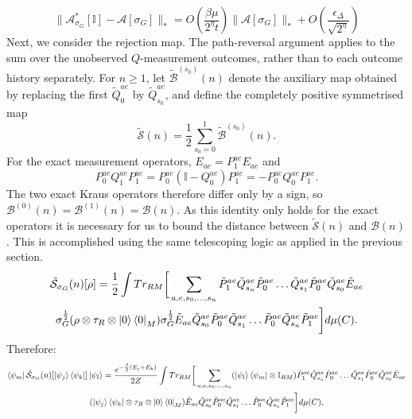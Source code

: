 \documentclass[aps,floatfix,10pt,amssymb,amsfont,amsmath,superscriptaddress,float,nofootinbib,longbibliography,nobalancelastpage,twocolumn]{revtex4-2}
\begin{document}
\begin{widetext}
\begin{equation}
    \|\mathcal{A}^*_{\sigma_G}[\mathbb{I}] - \mathcal{A}[\sigma_G]\|_* = O\!\left(\frac{\beta\mu}{2^{\eta}t}\right)\|\mathcal{A}[\sigma_G]\|_* + O\!\left(\frac{\epsilon_{\Delta}}{\sqrt{2^{\eta}}}\right)
\end{equation}
Next, we consider the rejection map.  The path-reversal argument applies to the
sum over the unobserved $Q$-measurement outcomes, rather than to each outcome
history separately.  For $n\geq 1$, let $\tilde{\mathcal{B}}^{(s_0)}(n)$ denote
the auxiliary map obtained by replacing the first $\tilde Q^{ae}_0$ by
$\tilde Q^{ae}_{s_0}$, and define the completely positive symmetrised map
\begin{equation*}
    \tilde{\mathcal{S}}(n)=\frac{1}{2}\sum_{s_0=0}^1
    \tilde{\mathcal{B}}^{(s_0)}(n).
\end{equation*}
For the exact measurement operators, $E_{ae}=P^{ae}_1E_{ae}$ and
\begin{equation*}
    P^{ae}_0Q^{ae}_1P^{ae}_1
    =P^{ae}_0(\mathbb I-Q^{ae}_0)P^{ae}_1
    =-P^{ae}_0Q^{ae}_0P^{ae}_1.
\end{equation*}
The two exact Kraus operators therefore differ only by a sign, so
$\mathcal{B}^{(0)}(n)=\mathcal{B}^{(1)}(n)=\mathcal{B}(n)$.  As this identity only holds for the exact operators it is necessary for us to bound the distance between $\tilde{\mathcal S}(n)$ and $\mathcal B(n)$. This is accomplished using the same telescoping logic as applied in the previous section.
\begin{multline}
    \tilde{\mathcal{S}}_{\sigma_G}(n)[\rho] = \frac12\int Tr_{RM}\bigg[ \sum_{a,e,s_0,\ldots,s_n}\tilde P^{ae}_1\tilde Q^{ae}_{s_n}\tilde P^{ae}_0\ldots \tilde Q^{ae}_{s_1}\tilde P^{ae}_0\tilde Q^{ae}_{s_0}\tilde E_{ae} \\\sigma_G^{\frac{1}{2}}(\rho\otimes \tau_R\otimes \ket{0}\bra{0}_M)\sigma_G^{\frac{1}{2}}  \tilde E_{ae}\tilde Q^{ae}_{s_0}\tilde P^{ae}_0\tilde Q^{ae}_{s_1}\ldots\tilde P^{ae}_0\tilde Q^{ae}_{s_n}\tilde P^{ae}_1\bigg]d\mu(C).
\end{multline}
Therefore:
\begin{multline}
    \bra{\psi_m}\tilde{\mathcal{S}}_{\sigma_G}(n)[\ket{\psi_j}\bra{\psi_k}]\ket{\psi_l} = \frac{e^{-\frac{\beta}{2}(E_j+E_k)}}{2Z}\int Tr_{RM}\bigg[ \sum_{a,e,s_0,\ldots,s_n}(\ket{\psi_l}\bra{\psi_m}\otimes \mathbb{I}_{RM})\tilde P^{ae}_1\tilde Q^{ae}_{s_n}\tilde P^{ae}_0\ldots\tilde Q^{ae}_{s_1}\tilde P^{ae}_0\tilde Q^{ae}_{s_0}\tilde E_{ae} \\(\ket{\psi_j}\bra{\psi_k}\otimes \tau_R\otimes \ket{0}\bra{0}_M)  \tilde E_{ae}\tilde Q^{ae}_{s_0}\tilde P^{ae}_0\tilde Q^{ae}_{s_1}\ldots\tilde P^{ae}_0\tilde Q^{ae}_{s_n}\tilde P^{ae}_1\bigg]d\mu(C).

\end{multline}
\end{widetext}
\end{document}
